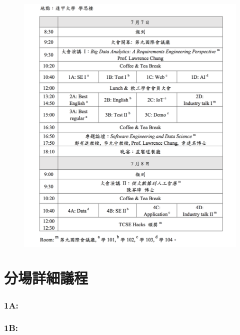 \documentclass[12pt,oneside,a4paper]{book}
\begin{document}
%
\begin{figure}[h!]
\begin{center}
\includegraphics[width=.95\columnwidth]{program.png}
\end{center}
\end{figure}

\chapter*{分場詳細議程}
%

\subsection*{1A: \TitleOneA}
\subsubsection*{\ChairOneA}
\ListOneA

\subsection*{1B: \TitleOneB}
\end{document}
